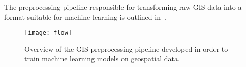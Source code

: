 The preprocessing pipeline responsible for transforming raw GIS data into a format suitable for machine learning is outlined in~.

\begin{figure}[H]
  \centering
  \texttt{[image: flow]}
  \caption{%
    Overview of the GIS preprocessing pipeline developed in order to train machine learning models on geospatial data.
  }%
  \label{fig:preprocessing-overview}
\end{figure}
